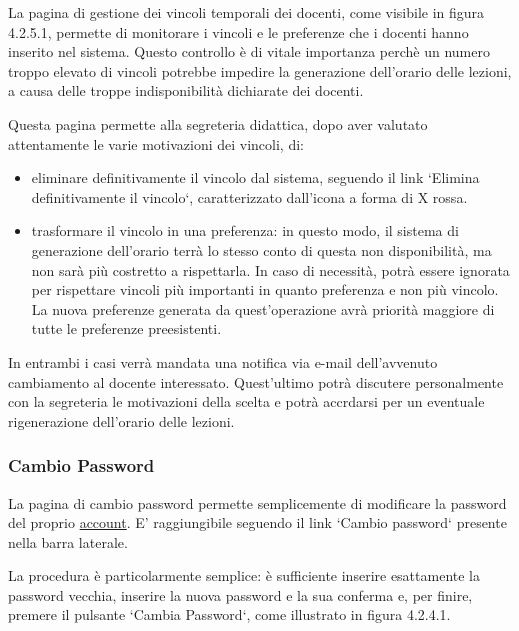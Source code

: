 \documentclass[11pt,a4paper]{article}
\begin{document}
La pagina di gestione dei vincoli temporali dei docenti, come visibile in figura 4.2.5.1, permette di monitorare i vincoli e le preferenze che i docenti hanno inserito nel sistema. Questo controllo è di vitale importanza perchè un numero troppo elevato di vincoli potrebbe impedire la generazione dell'orario delle lezioni, a causa delle troppe indisponibilità dichiarate dei docenti.

Questa pagina permette alla segreteria didattica, dopo aver valutato attentamente le varie motivazioni dei vincoli, di:
\begin{itemize}
 \item eliminare definitivamente il vincolo dal sistema, seguendo il link `Elimina definitivamente il vincolo`, caratterizzato dall'icona a forma di X rossa.
 \item trasformare il vincolo in una preferenza: in questo modo, il sistema di generazione dell'orario terrà lo stesso conto di questa non disponibilità, ma non sarà più costretto a rispettarla. In caso di necessità, potrà essere ignorata per rispettare vincoli più importanti in quanto preferenza e non più vincolo. La nuova preferenze generata da quest'operazione avrà priorità maggiore di tutte le preferenze preesistenti.
\end{itemize}
In entrambi i casi verrà mandata una notifica via e-mail dell'avvenuto cambiamento al docente interessato. Quest'ultimo potrà discutere personalmente con la segreteria le motivazioni della scelta e potrà accrdarsi per un eventuale rigenerazione dell'orario delle lezioni.
\subsubsection{Cambio Password}
La pagina di cambio password permette semplicemente di modificare la password del proprio \underline{account}. E' raggiungibile seguendo il link `Cambio password` presente nella barra laterale.

La procedura è particolarmente semplice: è sufficiente inserire esattamente la password vecchia, inserire la nuova password e la sua conferma e, per finire, premere il pulsante `Cambia Password`, come illustrato in figura 4.2.4.1.
\end{document}
